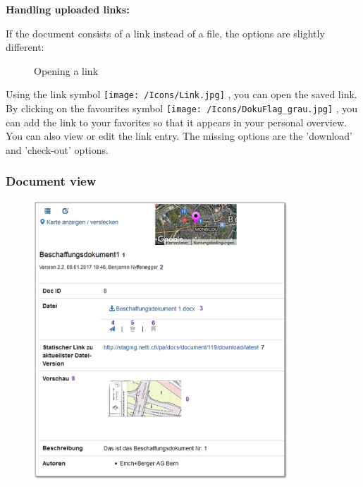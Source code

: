 \textbf{Handling uploaded links:}

If the document consists of a link instead of a file, the options are slightly different:

\begin{figure}[H]
\caption{Opening a link}
\end{figure}

Using the link symbol \texttt{[image: /Icons/Link.jpg]} , you can open the saved link. By clicking on the favourites symbol \texttt{[image: /Icons/DokuFlag\_grau.jpg]} , you can add the link to your favorites so that it appears in your personal overview. You can also view or edit the link entry. The missing options are the 'download' and 'check-out' options.


\pagebreak
\subsubsection{Document view}
\label{bkm:Ref443047930}

\begin{figure}
\vspace{-15pt}
\includegraphics[height=105mm]{../chapters/11_Dokumentenablage/pictures/11-2-5_Dokumentenansicht.jpg}
\end{figure}

